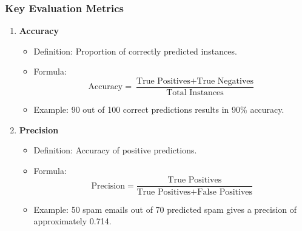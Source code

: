 \documentclass[aspectratio=169]{beamer}
\begin{document}
\begin{frame}
    \frametitle{Key Evaluation Metrics}
    \begin{enumerate}
        \item \textbf{Accuracy}
            \begin{itemize}
                \item Definition: Proportion of correctly predicted instances.
                \item Formula: 
                \[
                \text{Accuracy} = \frac{\text{True Positives} + \text{True Negatives}}{\text{Total Instances}}
                \]
                \item Example: 90 out of 100 correct predictions results in 90\% accuracy.
            \end{itemize}
        \item \textbf{Precision}
            \begin{itemize}
                \item Definition: Accuracy of positive predictions.
                \item Formula: 
                \[
                \text{Precision} = \frac{\text{True Positives}}{\text{True Positives} + \text{False Positives}}
                \]
                \item Example: 50 spam emails out of 70 predicted spam gives a precision of approximately 0.714.
            \end{itemize}
    \end{enumerate}
\end{frame}
\end{document}
